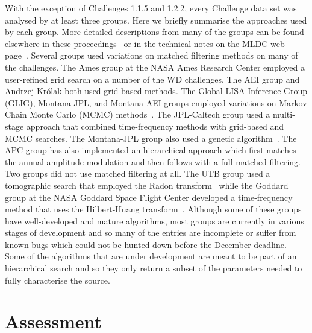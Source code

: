 \documentclass[12pt]{iopart}
\begin{document}
With the exception of Challenges 1.1.5 and 1.2.2, every Challenge data set was analysed by at least three groups. Here we briefly summarise the approaches used by each group. More detailed descriptions from many of the groups can be found elsewhere in these proceedings~\cite{auger07,camp07,crowder07,brown07,auger07,nayak07, porter07,prix07, roever07, stroeer07,thompson07} or in the technical notes on the MLDC web page~\cite{MLDCweb}. Several groups used variations on matched filtering methods on many of the challenges. The Ames group at the NASA Ames Research Center employed a user-refined grid search on a number of the WD challenges. The AEI group and Andrzej Kr\'olak both used grid-based methods. The Global LISA Inference Group (GLIG), Montana-JPL, and Montana-AEI groups employed variations on Markov Chain Monte Carlo (MCMC) methods~\cite{gilks96}. The JPL-Caltech group used a multi-stage approach that combined time-frequency methods with grid-based and MCMC searches. The Montana-JPL group also used a genetic algorithm~\cite{holland75}. The APC group has also implemented an hierarchical approach which first matches the annual amplitude modulation and then follows with a full matched filtering. Two groups did not use matched filtering at all. The UTB group used a tomographic search that employed the Radon transform~\cite{deans83} while the Goddard group at the NASA Goddard Space Flight Center developed a time-frequency method that uses the Hilbert-Huang transform~\cite{huang98}. Although some of these groups have well-developed and mature algorithms, most groups are currently in various stages of development and so many of the entries are incomplete or suffer from known bugs which could not be hunted down before the December deadline. Some of the algorithms that are under development are meant to be part of an hierarchical search and so they only return a subset of the parameters needed to fully characterise the source.

\section{Assessment}
\end{document}
